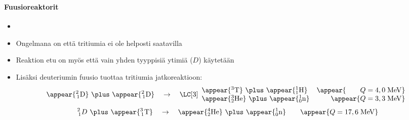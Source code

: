 \begin{frame}
\frametitle{\texorpdfstring{\culine[\sectiontitleulinecolor]{\sectiontitle}}{\sectiontitle} }
\framesubtitle{Fuusioreaktorit}
\appear{}

% 
\begin{itemize}
	\item {}      
	
	\item Ongelmana on että tritiumia ei ole helposti saatavilla
	
	\item Reaktion etu on myös että vain yhden tyyppisiä ytimiä ($D$) käytetään  
	
	\item Lisäksi deuteriumin fuusio tuottaa tritiumia jatkoreaktioon:
	$$
\appear{{ }_{\,1}^{2} \mathrm{D}}  ~\plus~ \appear{{ }_{\,1}^{2} \mathrm{D}} \quad \rightarrow \quad 
\LC[3] \begin{array}{ll} \appear{{ }^{3} \mathrm{T}} ~\plus~ \appear{{ }_{1}^{1} \mathrm{H}} & \appear{\qquad Q=4,0 \mathrm{\;MeV}} \\ \appear{{ }_{2}^{3} \mathrm{He}}  ~\plus~ \appear{{ }_{0}^{1} \mathrm{n}} & \qquad \appear{Q=3,3 \mathrm{\;MeV}} 
\end{array}
$$
\[
{ }_{\,1}^{2} D  ~\plus~ \appear{{ }_{\,1}^{3} \mathrm{T}} \quad \rightarrow \quad \appear{{ }_{2}^{4} \mathrm{He}}  ~\plus~ \appear{{ }_{0}^{1} \mathrm{n}} \qquad \appear{Q=17,6 \mathrm{\;MeV}}
\]

\end{itemize}

\endofslide 
\end{frame}

